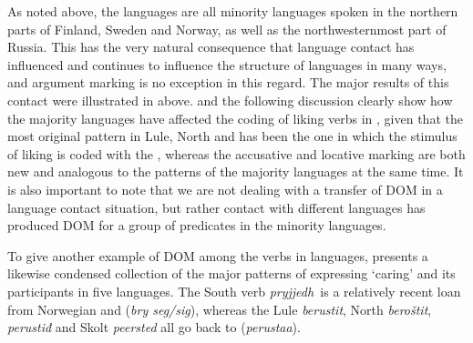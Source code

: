 \documentclass[output=paper]{LSP/langsci}
\begin{document}
As noted above, the  languages are all minority languages spoken in the northern parts of Finland, Sweden and Norway, as well as the northwesternmost part of Russia. This has the very natural consequence that language contact has influenced and continues to influence the structure of  languages in many ways, and argument marking is no exception in this regard. The major results of this contact were illustrated in  above.  and the following discussion clearly show how the majority languages have affected the coding of liking verbs in , given that the most original pattern in Lule, North and   has been the one in which the stimulus of liking is coded with the , whereas the accusative and locative marking are both new and analogous to the patterns of the majority languages at the same time. It is also important to note that we are not dealing with a transfer of DOM in a language contact situation, but rather contact with different languages has produced DOM for a group of predicates in the minority languages.

To give another example of DOM among the  verbs in  languages,  presents a likewise condensed collection of the major patterns of expressing ‘caring’ and its participants in five  languages. The South  verb \textit{pryjjedh~}is a relatively recent loan from Norwegian and  (\textit{bry seg/sig}), whereas the Lule  \textit{berustit}, North  \textit{beroštit},   \textit{perustiđ} and Skolt  \textit{peersted} all go back to  (\textit{perustaa}).
\end{document}
